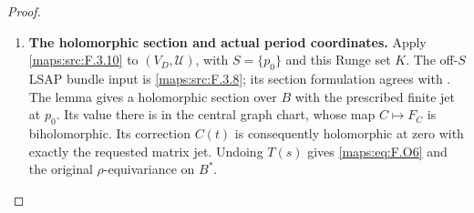 \begin{proof}
\begin{enumerate}[label=\arabic*.]
The sphere fibrations $U(n-1)\to U(n)\to S^{2n-1}$ give
$\pi_1U(3)=\mathbb Z$. Starting with $SO(3)=\mathbb{RP}^3$,
the fibrations $SO(n-1)\to SO(n)\to S^{n-1}$ for
$n=4,5,6$ give $\pi_1SO(6)=\mathbb Z/2$.
The unitary loop rotating one complex coordinate maps to a
real two-plane rotation through $2\pi$. Its quaternion lift
in $SO(3)$ starts at $1$ and ends at $-1$, so it is the
nontrivial element; the later inclusions retain that class.
Thus $\pi_1U(3)\to\pi_1SO(6)$ is onto, and the homotopy
sequence gives $\pi_1(SO(6)/U(3))=0$. The fibre is also
connected. The map $P$ gives the same conclusions for $PD_3$.

Retain the local section on a slightly larger disc than $K$.
Take a locally finite triangulation of its exterior, relative
to the boundary. The period bundle is trivial over each cell.
Extend the section over vertices and edges using connectedness
of the fibre, and over two-cells using its zero fundamental
group. These extensions agree on the attaching boundaries;
local finiteness gives a continuous global section, still
holomorphic near $K$. The point $p_0$ remains inside the
retained local disc throughout this construction.

\item \textbf{The holomorphic section and actual period coordinates.}
Apply \ref{maps:src:F.3.10} to $(V_D,\mathscr U)$, with
$S=\{p_0\}$ and this Runge set $K$. The off-$S$ LSAP
bundle input is \ref{maps:src:F.3.8}; its section formulation
agrees with \cite[Definition~7.7 and Proposition~7.13(d)]{AlarconForstneric2025Sections}.
The lemma gives a holomorphic section over $B$ with the
prescribed finite jet at $p_0$. Its value there is in the
central graph chart, whose map $C\mapsto F_C$ is
biholomorphic. Its correction $C(t)$ is consequently
holomorphic at zero with exactly the requested matrix jet.
Undoing $T(s)$ gives \eqref{maps:eq:F.O6} and the original
$\rho$-equivariance on $B^*$.


\end{enumerate}
\end{proof}
